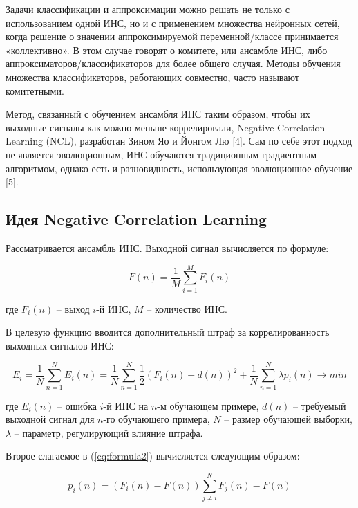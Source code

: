 \documentclass[12pt]{extarticle}
\begin{document}
Задачи классификации и аппроксимации можно решать не только с использованием одной ИНС, но и с применением множества нейронных сетей, когда решение о значении аппроксимируемой переменной/классе принимается «коллективно». В этом случае
говорят о комитете, или ансамбле ИНС, либо аппроксиматоров/классификаторов для более общего случая. Методы обучения множества классификаторов, работающих совместно, часто называют комитетными.

Метод, связанный с обучением ансамбля ИНС таким образом, чтобы их выходные сигналы как можно меньше коррелировали, Negative Correlation Learning (NCL), разработан Зином Яо и Йонгом Лю [4]. Сам по себе этот подход не является эволюционным, ИНС обучаются традиционным градиентным алгоритмом, однако есть и разновидность, использующая эволюционное обучение [5].

\subsection{Идея Negative Correlation Learning}

Рассматривается ансамбль ИНС. Выходной сигнал вычисляется по формуле:

\begin{equation} \label{eq:formula1}
F(n) = \frac{1}{M}\sum_{i=1}^{M} F_i(n) 
\end{equation}

\noindent
где \(F_i(n)\) -- выход  \(i\)-й ИНС, \(M\) -- количество ИНС.

В целевую функцию вводится дополнительный штраф за коррелированность выходных сигналов ИНС:

\begin{equation} \label{eq:formula2}
E_i = \frac{1}{N}\sum_{n=1}^{N}E_i(n)=\frac{1}{N}\sum_{n=1}^{N}\frac{1}{2}(F_i(n)-d(n))^2 + \frac{1}{N}\sum_{n=1}^{N} \lambda p_i(n) \to min
\end{equation}

\noindent
где \(E_i(n)\) -- ошибка \(i\)-й ИНС на \(n\)-м обучающем примере, \(d(n)\) -- требуемый выходной сигнал для \(n\)-го обучающего примера, \(N\) -- размер обучающей выборки, \(\lambda\) -- параметр, регулирующий влияние штрафа.

Второе слагаемое в (\ref{eq:formula2}) вычисляется следующим образом:

\begin{equation} \label{eq:formula3}
p_i(n) = (F_i(n)-F(n))\sum_{j \neq i}^{N}F_j(n) - F(n)
\end{equation}
\end{document}
